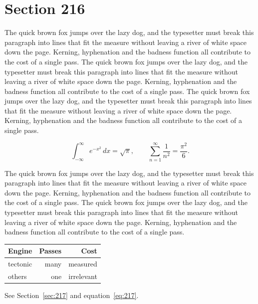 \documentclass{article}
\begin{document}
\section{Section 216}
\label{sec:216}
The quick brown fox jumps over the lazy dog, and the typesetter must break this paragraph into lines that fit the measure without leaving a river of white space down the page. Kerning, hyphenation and the badness function all contribute to the cost of a single pass. The quick brown fox jumps over the lazy dog, and the typesetter must break this paragraph into lines that fit the measure without leaving a river of white space down the page. Kerning, hyphenation and the badness function all contribute to the cost of a single pass. The quick brown fox jumps over the lazy dog, and the typesetter must break this paragraph into lines that fit the measure without leaving a river of white space down the page. Kerning, hyphenation and the badness function all contribute to the cost of a single pass. 

\begin{equation}\label{eq:216}
\int_{-\infty}^{\infty} e^{-x^{2}}\,dx = \sqrt{\pi}, \qquad
\sum_{n=1}^{\infty} \frac{1}{n^{2}} = \frac{\pi^{2}}{6}.
\end{equation}

The quick brown fox jumps over the lazy dog, and the typesetter must break this paragraph into lines that fit the measure without leaving a river of white space down the page. Kerning, hyphenation and the badness function all contribute to the cost of a single pass. The quick brown fox jumps over the lazy dog, and the typesetter must break this paragraph into lines that fit the measure without leaving a river of white space down the page. Kerning, hyphenation and the badness function all contribute to the cost of a single pass. 

\begin{center}
\begin{tabular}{lrr}
\toprule
Engine & Passes & Cost \\
\midrule
tectonic & many & measured \\
others & one & irrelevant \\
\bottomrule
\end{tabular}
\end{center}

See Section~\ref{sec:217} and equation~\eqref{eq:217}.
\end{document}
